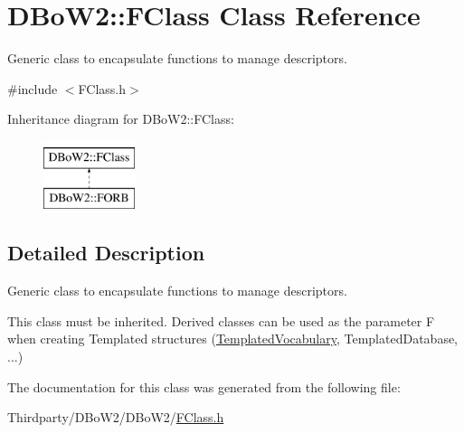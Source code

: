 \hypertarget{class_d_bo_w2_1_1_f_class}{}\section{D\+Bo\+W2\+:\+:F\+Class Class Reference}
\label{class_d_bo_w2_1_1_f_class}


Generic class to encapsulate functions to manage descriptors.  




{\ttfamily \#include $<$F\+Class.\+h$>$}

Inheritance diagram for D\+Bo\+W2\+:\+:F\+Class\+:\begin{figure}[H]
\begin{center}
\leavevmode
\includegraphics[height=2.000000cm]{class_d_bo_w2_1_1_f_class}
\end{center}
\end{figure}


\subsection{Detailed Description}
Generic class to encapsulate functions to manage descriptors. 

This class must be inherited. Derived classes can be used as the parameter F when creating Templated structures (\mbox{\hyperlink{class_d_bo_w2_1_1_templated_vocabulary}{Templated\+Vocabulary}}, Templated\+Database, ...) 

The documentation for this class was generated from the following file\+:\begin{DoxyCompactItemize}
\item 
Thirdparty/\+D\+Bo\+W2/\+D\+Bo\+W2/\mbox{\hyperlink{_f_class_8h}{F\+Class.\+h}}\end{DoxyCompactItemize}
